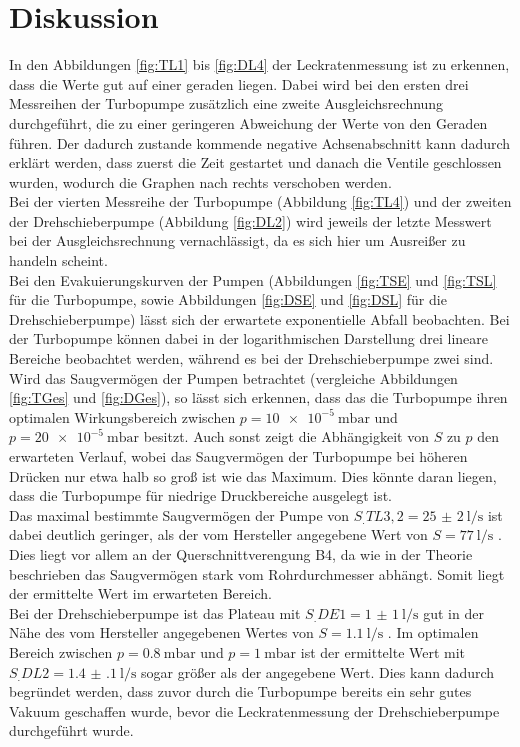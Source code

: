
\section{Diskussion}
\label{sec:Diskussion}

In den Abbildungen \ref{fig:TL1} bis \ref{fig:DL4} der Leckratenmessung ist zu erkennen, dass die Werte gut auf einer geraden liegen. Dabei wird bei den ersten drei Messreihen der Turbopumpe zusätzlich eine zweite Ausgleichsrechnung durchgeführt, die zu einer geringeren Abweichung der Werte von den Geraden führen. Der dadurch zustande kommende negative Achsenabschnitt kann dadurch erklärt werden, dass zuerst die Zeit gestartet und danach die Ventile geschlossen wurden, wodurch die Graphen nach rechts verschoben werden.\\
Bei der vierten Messreihe der Turbopumpe (Abbildung \ref{fig:TL4}) und der zweiten der Drehschieberpumpe (Abbildung \ref{fig:DL2}) wird jeweils der letzte Messwert bei der Ausgleichsrechnung vernachlässigt, da es sich hier um Ausreißer zu handeln scheint.\\
Bei den Evakuierungskurven der Pumpen (Abbildungen \ref{fig:TSE} und \ref{fig:TSL} für die Turbopumpe, sowie Abbildungen \ref{fig:DSE} und \ref{fig:DSL} für die Drehschieberpumpe) lässt sich der erwartete exponentielle Abfall beobachten. Bei der Turbopumpe können dabei in der logarithmischen Darstellung drei lineare Bereiche beobachtet werden, während es bei der Drehschieberpumpe zwei sind.\\
Wird das Saugvermögen der Pumpen betrachtet (vergleiche Abbildungen \ref{fig:TGes} und \ref{fig:DGes}), so lässt sich erkennen, dass das die Turbopumpe ihren optimalen Wirkungsbereich zwischen $p=\SI{10e-5}{\milli\bar}$ und $p=\SI{20e-5}{\milli\bar}$ besitzt. Auch sonst zeigt die Abhängigkeit von $S$ zu $p$ den erwarteten Verlauf, wobei das Saugvermögen der Turbopumpe bei höheren Drücken nur etwa halb so groß ist wie das Maximum. Dies könnte daran liegen, dass die Turbopumpe für niedrige Druckbereiche ausgelegt ist.\\
Das maximal bestimmte Saugvermögen der Pumpe von $S_.{TL3,2}=\SI{25(2)}{\litre\per\second}$ ist dabei deutlich geringer, als der vom Hersteller angegebene Wert von $S=\SI{77}{\litre\per\second}$ \cite{V70}. Dies liegt vor allem an der Querschnittverengung B4, da wie in der Theorie beschrieben das Saugvermögen stark vom Rohrdurchmesser abhängt. Somit liegt der ermittelte Wert im erwarteten Bereich.\\
Bei der Drehschieberpumpe ist das Plateau mit $S_.{DE1}=\SI{1(1)}{\litre\per\second}$ gut in der Nähe des vom Hersteller angegebenen Wertes von $S=\SI{1.1}{\litre\per\second}$ \cite{V70}.
Im optimalen Bereich zwischen $p=\SI{0.8}{\milli\bar}$ und $p=\SI{1}{\milli\bar}$ ist der ermittelte Wert mit $S_.{DL2}=\SI{1.4(1)}{\litre\per\second}$ sogar größer als der angegebene Wert. Dies kann dadurch begründet werden, dass zuvor durch die Turbopumpe bereits ein sehr gutes Vakuum geschaffen wurde, bevor die Leckratenmessung der Drehschieberpumpe durchgeführt wurde.   